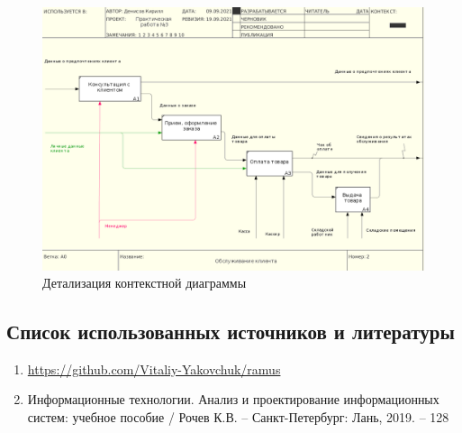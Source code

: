 \documentclass[a4paper,14pt]{extarticle}
\begin{document}
\newpage
\begin{figure}[htpb]
	\centering
	\includegraphics[width=0.8\linewidth]{images/ramusPr31}
	\caption{Детализация контекстной диаграммы}
	\label{fig:ramuspr31}
\end{figure}

	\newpage
	\subsection*{Список использованных источников и литературы}
	\begin{enumerate}
		\item \url{https://github.com/Vitaliy-Yakovchuk/ramus}
		\item Информационные технологии. Анализ и проектирование информационных систем: учебное пособие / Рочев К.В. – Санкт-Петербург: Лань, 2019. – 128
	\end{enumerate}
\end{document}
